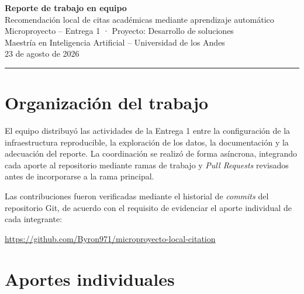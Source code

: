 \documentclass[11pt]{article}
\begin{document}
\begin{center}
{\large\bfseries\color{primaryblue} Reporte de trabajo en equipo}\\[0.15cm]
{\color{midgray} Recomendación local de citas académicas mediante aprendizaje automático}\\[0.15cm]
{\color{midgray} Microproyecto -- Entrega 1 · Proyecto: Desarrollo de soluciones}\\[0.15cm]
{\color{midgray} Maestría en Inteligencia Artificial -- Universidad de los Andes}\\[0.15cm]
{\color{midgray} 23 de agosto de 2026}
\end{center}

\vspace{0.2cm}
{\color{primaryblue}\rule{\linewidth}{0.8pt}}
\vspace{0.2cm}

\section{Organización del trabajo}

El equipo distribuyó las actividades de la Entrega 1 entre la configuración de
la infraestructura reproducible, la exploración de los datos, la documentación y
la adecuación del reporte. La coordinación se realizó de forma asíncrona,
integrando cada aporte al repositorio mediante ramas de trabajo y \textit{Pull
Requests} revisados antes de incorporarse a la rama principal.

Las contribuciones fueron verificadas mediante el historial de \textit{commits}
del repositorio Git, de acuerdo con el requisito de evidenciar el aporte
individual de cada integrante:

\begin{center}
\url{https://github.com/Byron971/microproyecto-local-citation}
\end{center}

\section{Aportes individuales}
\end{document}
